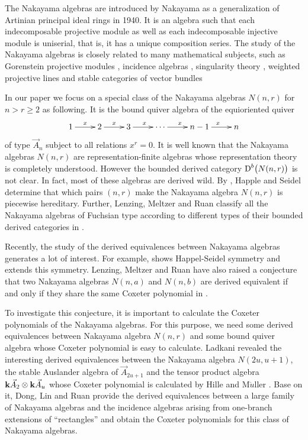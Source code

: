 \documentclass[a4paper, reqno]{amsart}
\theoremstyle{definition}
\theoremstyle{remark}
\numberwithin{equation}{section}
\begin{document}
The Nakayama algebras are introduced by Nakayama \cite{N1940} as a generalization of Artinian principal ideal rings in 1940. It is an algebra such that each indecomposable projective module as well as each indecomposable injective module is uniserial, that is, it has a unique composition series. The study of the Nakayama algebras is closely related to many mathematical subjects, such as Gorenstein projective modules \cite{Ringel2013}, incidence algebras \cite{Lad2008}, singularity theory \cite{LMR2023,Shen2015,Shen2017}, weighted projective lines and stable categories of vector bundles \cite{KLM1,KLM2,LMR2023}

In our paper we focus on a special class of the Nakayama algebras $N(n,r)$ for $n>r\geq 2$ as following. It is the bound quiver algebra of the equioriented quiver
$$\xymatrix{1\ar[r]^{x}&2\ar[r]^{x}&3\ar[r]^{x}&\cdots\ar[r]^{x}&n-1\ar[r]^{x}&n}$$
of type $\vec{A}_n$ subject to all relations $x^r=0$. It is well known that the Nakayama algebras $N(n,r)$ are representation-finite algebras whose representation theory is completely understood. However the bounded derived category $\textup{D}^{b}\big(N(n,r)\big)$ is not clear. In fact, most of these algebras are derived wild. By \cite{HS2010}, Happle and Seidel determine that which pairs $(n,r)$ make the Nakayama algebra $N(n,r)$ is piecewise hereditary. Further, Lenzing, Meltzer and Ruan classify all the Nakayama algebras of Fuchsian type according to different types of their bounded derived categories in \cite{LMR2023}.

Recently, the study of the derived equivalences between Nakayama algebras generates a lot of interest. For example, \cite{HS2010} shows Happel-Seidel symmetry and \cite{LMR2023} extends this symmetry. Lenzing, Meltzer and Ruan have also raised a conjecture that two Nakayama algebras $N(n,a)$ and $N(n,b)$ are derived equivalent if and only if they share the same Coxeter polynomial in \cite{LMR2023}. 

To investigate this conjecture, it is important to calculate the Coxeter polynomials of the Nakayama algebras. For this purpose, we need some derived equivalences between Nakayama algebra $N(n,r)$ and some bound quiver algebra whose Coxeter polynomial is easy to calculate. Ladkani \cite{Lad2012} revealed the interesting derived equivalences between the Nakayama algebra $N(2u,u+1)$, the stable Auslander algebra of $\vec{A}_{2u+1}$ and the tensor product algebra ${\bf k}\vec{A}_2\otimes{\bf k}\vec{A}_u$ whose Coxeter polynomial is calculated by Hille and M$\ddot{u}$ller \cite{HM2014}. Base on it, Dong, Lin and Ruan \cite{DLR} provide the derived equivalences between a large family of Nakayama algebras and the incidence algebras arising from one-branch extensions of ``rectangles'' and obtain the Coxeter polynomials for this class of Nakayama algebras.
\end{document}
